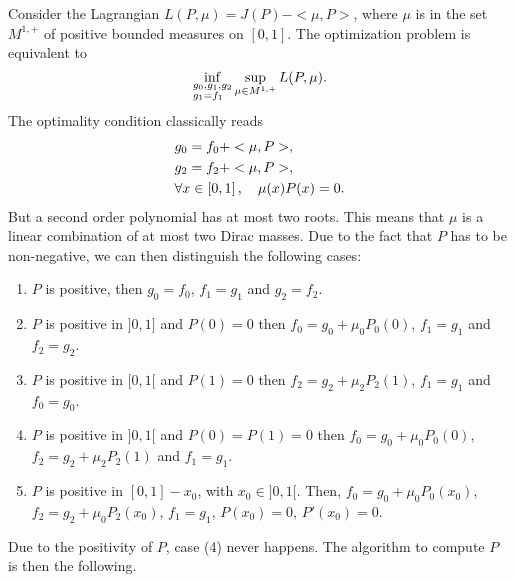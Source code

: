 \documentclass{fldauth}
\theoremstyle{plain}
\theoremstyle{plain}
\theoremstyle{plain}
\theoremstyle{plain}
\theoremstyle{plain}
\theoremstyle{plain}
\begin{document}
Consider the Lagrangian $L(P,\mu)=J(P)-<\mu,P>$, where $\mu$ is in
the set $M^{1,+}$ of positive bounded measures on $[0,1]$. The
optimization problem is equivalent to
\begin{equation}\label{infsup}
\mathop {\inf } \limits_{\begin{subarray}{l}
  g_0 ,g_1 ,g_2  \\
  g_1  = f_1
\end{subarray}}  \mathop {\sup }\limits_{\mu  \in M^{1, + } } L(P,\mu ).
\end{equation}
The optimality condition classically reads\[
\begin{gathered}
  g_0  = f_0  +  < \mu ,P > , \hfill \\
  g_2  = f_2  +  < \mu ,P > , \hfill \\
  \forall x \in \left[ {0,1} \right],\quad \mu (x)P(x) = 0. \hfill \\
\end{gathered}
\]
But a second order polynomial has at most two roots. This means
that $\mu$ is a linear combination of at most two Dirac masses.
Due to the fact that $P$ has to be non-negative, we can then
distinguish the following cases:
\begin{enumerate}
    \item $P$ is positive, then $g_0=f_0$, $f_1=g_1$ and
    $g_2=f_2$.
    \item $P$ is positive in $]0,1]$ and $P(0)=0$ then
    $f_0=g_0+\mu_0 P_0(0)$, $f_1=g_1$ and $f_2=g_2$.
    \item $P$ is positive in $[0,1[$ and $P(1)=0$ then
    $f_2=g_2+\mu_2 P_2(1)$, $f_1=g_1$ and $f_0=g_0$.
    \item $P$ is positive in $]0,1[$ and $P(0)=P(1)=0$ then
    $f_0=g_0+\mu_0 P_0(0)$, $f_2=g_2+\mu_2 P_2(1)$ and $f_1=g_1$.
    \item $P$ is positive in $[0,1]-x_0$, with $x_0 \in ]0,1[$.
    Then, $f_0=g_0+\mu_0 P_0(x_0)$, $f_2=g_2+\mu_0 P_2(x_0)$,
    $f_1=g_1$,
    $P(x_0)=0$, $P'(x_0)=0$.
\end{enumerate}
Due to the positivity of $P$, case (4) never happens. The
algorithm to compute $P$ is then the following.
\end{document}
